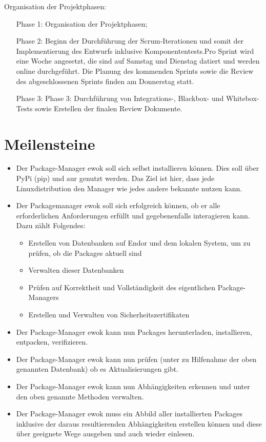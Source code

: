 Organisation der Projektphasen:
\begin{itemize}
	\item[Phase 1:] Organisation der Projektphasen;
	\item[Phase 2:] Beginn der Durchführung der Scrum-Iterationen und somit der Implementierung des Entwurfs inklusive Komponententests.Pro Sprint wird eine Woche angesetzt, die  sind auf Samstag und Dienstag datiert und werden online durchgeführt. Die Planung des kommenden Sprints sowie die Review des abgeschlossenen Sprints finden am Donnerstag statt.
	\item[Phase 3:] 	Phase 3: Durchführung von Integrations-, Blackbox- und Whitebox- Tests sowie Erstellen der finalen Review Dokumente.
	
	
\end{itemize}
\clearpage
\section{Meilensteine}

\begin{itemize}
	\item 
		Der Package-Manager ewok soll sich selbst installieren können. Dies soll über PyPi (pip) und aur genutzt werden. Das Ziel ist hier, dass jede Linuxdistribution den Manager wie jedes andere bekannte  nutzen kann.
	
	\item Der Packagemanager ewok soll sich erfolgreich  können, ob er alle erforderlichen Anforderungen erfüllt und gegebenenfalls interagieren kann. Dazu zählt Folgendes:
		
		\begin{itemize}	
			\item Erstellen von Datenbanken auf Endor und dem lokalen System, um zu prüfen, ob die Packages aktuell sind
			\item Verwalten dieser Datenbanken
			\item Prüfen auf Korrektheit und Vollständigkeit des eigentlichen Package-Managers
			\item Erstellen und Verwalten von Sicherheitszertifikaten
		\end{itemize}
	\item Der Package-Manager ewok kann nun Packages herunterladen, installieren, entpacken, verifizieren.
	\item Der Package-Manager ewok kann nun prüfen (unter zu Hilfenahme der oben genannten Datenbank) ob es Aktualisierungen gibt.
	\item Der Package-Manager ewok kann nun Abhängigkeiten erkennen und unter den oben genannte Methoden verwalten.
	\item Der Package-Manager ewok muss ein Abbild aller installierten Packages inklusive der daraus resultierenden Abhängigkeiten erstellen können und diese über geeignete Wege ausgeben und auch wieder einlesen.
\end{itemize}